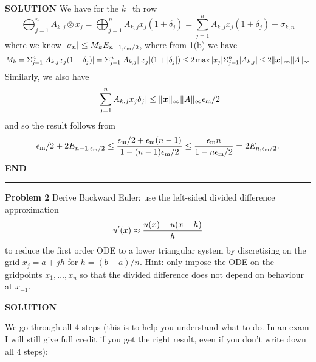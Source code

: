 \documentclass[12pt,a4paper]{article}
\def\x{ {\vc x} }
\begin{document}
\textbf{SOLUTION} We have for the $k$=th row
\[
\ensuremath{\bigoplus}_{j=1}^n A_{k,j} \ensuremath{\otimes} x_j =  \ensuremath{\bigoplus}_{j=1}^n A_{k,j} x_j (1+\ensuremath{\delta}_j) = 
\ensuremath{\sum}_{j=1}^n A_{k,j} x_j (1+\ensuremath{\delta}_j) + \ensuremath{\sigma}_{k,n}
\]
where we know $|\ensuremath{\sigma}_n| \ensuremath{\leq} M_k E_{n-1,\ensuremath{\epsilon}_{\rm m}/2}$, where from 1(b) we have
\[
M_k = \ensuremath{\Sigma}_{j=1}^n |A_{k,j}x_j (1+\ensuremath{\delta}_j)| = \ensuremath{\Sigma}_{j=1}^n |A_{k,j}| |x_j| (1+|\ensuremath{\delta}_j|)  \ensuremath{\leq} 2 \max |x_j| \ensuremath{\Sigma}_{j=1}^n |A_{k,j}|
\ensuremath{\leq} 2 \|\ensuremath{\bm{\x}}\|_\ensuremath{\infty} \|A \|_\ensuremath{\infty}
\]
Similarly, we also have 
\[
|\ensuremath{\sum}_{j=1}^n A_{k,j} x_j \ensuremath{\delta}_j| \ensuremath{\leq} \|\ensuremath{\bm{\x}}\|_\ensuremath{\infty} \|A \|_\ensuremath{\infty} \ensuremath{\epsilon}_{\rm m}/2
\]
and so the result follows from
\[
\ensuremath{\epsilon}_{\rm m}/2 + 2E_{n-1,\ensuremath{\epsilon}_{\rm m}/2} \ensuremath{\leq} {\ensuremath{\epsilon}_{\rm m}/2 + \ensuremath{\epsilon}_{\rm m} (n-1) \over 1-(n-1)\ensuremath{\epsilon}_{\rm m}/2} \ensuremath{\leq} {\ensuremath{\epsilon}_{\rm m} n \over 1-n\ensuremath{\epsilon}_{\rm m}/2} = 2E_{n,\ensuremath{\epsilon}_{\rm m}/2}.
\]
\textbf{END}

\rule{\textwidth}{1pt}
\textbf{Problem 2} Derive  Backward Euler: use the left-sided divided difference approximation
\[
u'(x) \ensuremath{\approx} {u(x) - u(x-h)  \over h}
\]
to reduce the first order ODE
to a lower triangular system by discretising on the grid $x_j = a + j h$ for $h = (b-a)/n$. Hint: only impose the ODE on the gridpoints $x_1,\ensuremath{\ldots},x_n$ so that the divided difference does not depend on behaviour at $x_{-1}$.

\textbf{SOLUTION}

We go through all 4 steps (this is to help you understand what to do. In an exam I will still give full credit if you get the right result, even if you don't write down all 4 steps):
\end{document}
